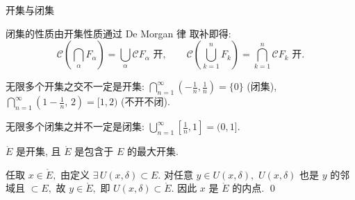 \begin{frame}{开集与闭集}

闭集的性质由开集性质通过 \alert{De Morgan 律} 取补即得:
\[
\mathscr{C}\!\left(\bigcap_\alpha F_\alpha\right) = \bigcup_\alpha \mathscr{C} F_\alpha \text{ 开}, \qquad
\mathscr{C}\!\left(\bigcup_{k=1}^n F_k\right) = \bigcap_{k=1}^n \mathscr{C} F_k \text{ 开}.
\]

\vspace{0.5em}
\pause

\begin{attnblock}
无限多个开集之交不一定是开集: $\displaystyle\bigcap_{n=1}^{\infty} \!\left(-\tfrac{1}{n}, \tfrac{1}{n}\right) = \{0\}$ (闭集), \ $\displaystyle\bigcap_{n=1}^{\infty} \!\left(1 - \tfrac{1}{n},\, 2\right) = [1, 2)$ (不开不闭).

无限多个闭集之并不一定是闭集: $\displaystyle\bigcup_{n=1}^{\infty} \!\left[\tfrac{1}{n}, 1\right] = (0, 1]$.
\end{attnblock}

\pause
\vspace{0.5em}

\begin{prop}
$\mathring{E}$ 是开集, 且 $\mathring{E}$ 是包含于 $E$ 的最大开集.
\end{prop}

\startproof[bg=yellow, fg=red]
任取 $x \in \mathring{E},$ 由定义 $\exists\, U(x,\delta) \subset E.$ 对任意 $y \in U(x,\delta),$ $U(x,\delta)$ 也是 $y$ 的邻域且 $\subset E,$ 故 $y \in \mathring{E},$ 即 $U(x,\delta) \subset \mathring{E}.$ 因此 $x$ 是 $\mathring{E}$ 的内点.
\qed

\end{frame}


